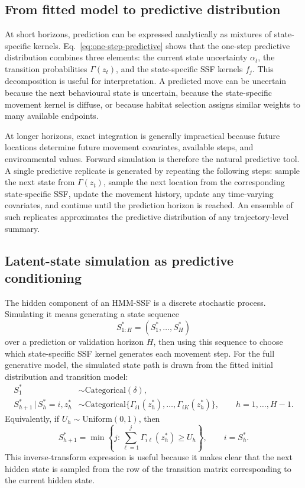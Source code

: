 \documentclass[11pt]{article}
\newcommand{\given}{\,\vert\,}
\begin{document}
\subsection{From fitted model to predictive distribution}

At short horizons, prediction can be expressed analytically as mixtures of
state-specific kernels. Eq.~\eqref{eq:one-step-predictive} shows that the
one-step predictive distribution combines three elements: the current state
uncertainty $\alpha_t$, the transition probabilities $\Gamma(z_t)$, and the
state-specific SSF kernels $f_j$. This decomposition is useful for
interpretation. A predicted move can be uncertain because the next behavioural
state is uncertain, because the state-specific movement kernel is diffuse, or
because habitat selection assigns similar weights to many available endpoints.

At longer horizons, exact integration is generally impractical because future
locations determine future movement covariates, available steps, and
environmental values. Forward simulation is therefore the natural predictive
tool. A single predictive replicate is generated by repeating the following
steps: sample the next state from $\Gamma(z_t)$, sample the next location from
the corresponding state-specific SSF, update the movement history, update any
time-varying covariates, and continue until the prediction horizon is reached.
An ensemble of such replicates approximates the predictive distribution of any
trajectory-level summary.

\subsection{Latent-state simulation as predictive conditioning}

The hidden component of an HMM-SSF is a discrete stochastic process. Simulating
it means generating a state sequence
\[
  S_{1:H}^{\ast} = (S_1^{\ast},\ldots,S_H^{\ast})
\]
over a prediction or validation horizon $H$, then using this sequence to choose
which state-specific SSF kernel generates each movement step. For the full
generative model, the simulated state path is drawn from the fitted initial
distribution and transition model:
\begin{align*}
  S_1^{\ast} &\sim \mathrm{Categorical}(\delta), \\
  S_{h+1}^{\ast} \given S_h^{\ast}=i, z_h^{\ast}
  &\sim
  \mathrm{Categorical}\{\Gamma_{i1}(z_h^{\ast}),\ldots,\Gamma_{iK}(z_h^{\ast})\},
  \qquad h=1,\ldots,H-1 .
\end{align*}
Equivalently, if $U_h \sim \mathrm{Uniform}(0,1)$, then
\begin{equation*}
  S_{h+1}^{\ast}
  =
  \min\left\{
    j:
    \sum_{\ell=1}^{j} \Gamma_{i\ell}(z_h^{\ast}) \ge U_h
  \right\},
  \qquad i=S_h^{\ast}.
\end{equation*}
This inverse-transform expression is useful because it makes clear that the
next hidden state is sampled from the row of the transition matrix
corresponding to the current hidden state.
\end{document}
